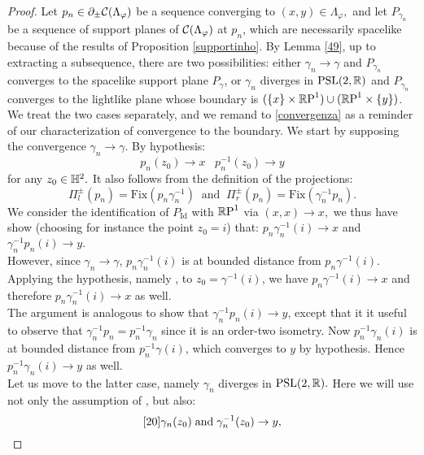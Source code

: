 \begin{proof}
    Let $p_n\in\partial_\pm\CF$ be a sequence converging to $(x,y)\in\Lambda_\varphi,$ and let $P_{\gamma_n}$ be a sequence of support planes of $\CF$ at $p_n$, which are necessarily spacelike because of the results of Proposition \ref{supportinho}. By Lemma \ref{49}, up to extracting a subsequence, there are two possibilities: either $\gamma_n\to\gamma$ and $P_{\gamma_n}$ converges to the spacelike support plane $P_\gamma$, or $\gamma_n$ diverges in $\PSL$ and $P_{\gamma_n}$ converges to the lightlike plane whose boundary is $(\{x\}\times\S)\cup(\S\times\{y\})$. We treat the two cases separately, and we remand to \ref{convergenza} as a reminder of our characterization of convergence to the boundary.
    We start by supposing the convergence $\gamma_n\to\gamma.$ By hypothesis: 
    \begin{equation}\label{18}
        p_n(z_0)\to x \;\;\; p_n^{-1}(z_0)\to y
    \end{equation}
    for any $z_0\in\H^2.$ It also follows from the definition of the projections: 
    \begin{equation}\label{19}
        \Pi_l^\pm(p_n)=\text{Fix}(p_n\gamma_n^{-1}) \;\; \text{and}\;\; \Pi_r^\pm(p_n)=\text{Fix}(\gamma_n^{-1}p_n).
    \end{equation}
  We consider the identification of $P_\text{Id}$ with $\S$ via $(x,x)\to x,$ we thus have show (choosing for instance the point $z_0=i$) that: $p_n\gamma_n^{-1}(i)\to x$ and $\gamma_n^{-1}p_n(i)\to y.$ \\
  However, since $\gamma_n\to\gamma$, $p_n\gamma_n^{-1}(i)$ is at bounded distance from $p_n\gamma^{-1}(i)$. Applying the hypothesis, namely , to $z_0=\gamma^{-1}(i)$, we have $p_n\gamma^{-1}(i)\to x$ and therefore $p_n\gamma_n^{-1}(i)\to x$ as well. \\
  The argument is analogous to show that $\gamma_n^{-1}p_n(i)\to y$, except that it it useful to observe that $\gamma_n^{-1}p_n=p_n^{-1}\gamma_n$ since it is an order-two isometry. Now $p_n^{-1}\gamma_n(i)$ is at bounded distance from $p_n^{-1}\gamma(i)$, which converges to $y$ by hypothesis. Hence $p_n^{-1}\gamma_n(i)\to y$ as well. \\
  Let us move to the latter case, namely $\gamma_n$ diverges in $\PSL.$ Here we will use not only the assumption of , but also: 
  \begin{equation}\refeq{20}
    \gamma_n(z_0)\;\text{and}\;\gamma_n^{-1}(z_0)\to y,
  \end{equation} 

\end{proof}

